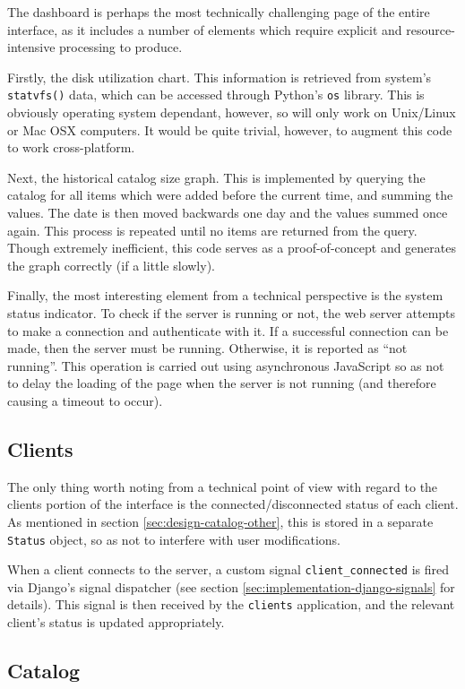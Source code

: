 The dashboard is perhaps the most technically challenging page of the entire
interface, as it includes a number of elements which require explicit and
resource-intensive processing to produce.

Firstly, the disk utilization chart. This information is retrieved from
system's \verb!statvfs()! data, which can be accessed through Python's
\verb!os! library. This is obviously operating system dependant, however, so
will only work on Unix/Linux or Mac OSX computers. It would be quite trivial,
however, to augment this code to work cross-platform.

Next, the historical catalog size graph. This is implemented by querying the
catalog for all items which were added before the current time, and summing the
values. The date is then moved backwards one day and the values summed once
again. This process is repeated until no items are returned from the query.
Though extremely inefficient, this code serves as a proof-of-concept and
generates the graph correctly (if a little slowly).

Finally, the most interesting element from a technical perspective is the
system status indicator. To check if the server is running or not, the web
server attempts to make a connection and authenticate with it. If a successful
connection can be made, then the server must be running. Otherwise, it is
reported as ``not running''. This operation is carried out using asynchronous
JavaScript so as not to delay the loading of the page when the server is not
running (and therefore causing a timeout to occur).

\subsection{Clients}

The only thing worth noting from a technical point of view with regard to the
clients portion of the interface is the connected/disconnected status of each
client. As mentioned in section \ref{sec:design-catalog-other}, this is stored
in a separate \verb!Status! object, so as not to interfere with user
modifications.

When a client connects to the server, a custom signal \verb!client_connected!
is fired via Django's signal dispatcher (see section
\ref{sec:implementation-django-signals} for details). This signal is then
received by the \verb!clients! application, and the relevant client's status is
updated appropriately.

\subsection{Catalog}


